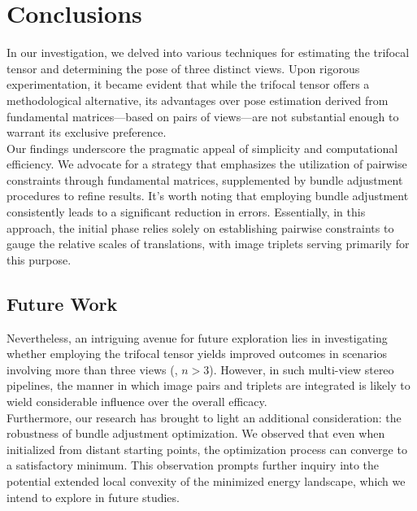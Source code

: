 \section{Conclusions}\label{sec:conclusions}
In our investigation, we delved into various techniques for estimating the trifocal tensor and determining the pose of three distinct views. Upon rigorous experimentation, it became evident that while the trifocal tensor offers a methodological alternative, its advantages over pose estimation derived from fundamental matrices—based on pairs of views—are not substantial enough to warrant its exclusive preference.\\

Our findings underscore the pragmatic appeal of simplicity and computational efficiency. We advocate for a strategy that emphasizes the utilization of pairwise constraints through fundamental matrices, supplemented by bundle adjustment procedures to refine results. It's worth noting that employing bundle adjustment consistently leads to a significant reduction in errors. Essentially, in this approach, the initial phase relies solely on establishing pairwise constraints to gauge the relative scales of translations, with image triplets serving primarily for this purpose.

\subsection{Future Work}

Nevertheless, an intriguing avenue for future exploration lies in investigating whether employing the trifocal tensor yields improved outcomes in scenarios involving more than three views (\ie, \( n > 3 \)). However, in such multi-view stereo pipelines, the manner in which image pairs and triplets are integrated is likely to wield considerable influence over the overall efficacy.\\

Furthermore, our research has brought to light an additional consideration: the robustness of bundle adjustment optimization. We observed that even when initialized from distant starting points, the optimization process can converge to a satisfactory minimum. This observation prompts further inquiry into the potential extended local convexity of the minimized energy landscape, which we intend to explore in future studies.
